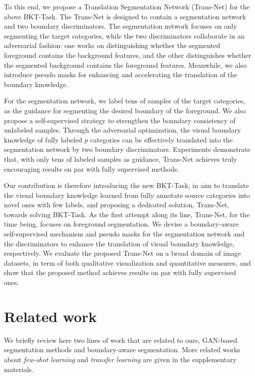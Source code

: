 \documentclass[letterpaper]{article} %
\begin{document}
To this end, we propose a Translation Segmentation Network (Trans-Net) for the above BKT-Task. The Trans-Net is designed to contain a segmentation network and two boundary discriminators. The segmentation network focuses on only segmenting the target categories, while the two discriminators collaborate in an
adversarial fashion: one works {on distinguishing whether the segmented foreground contains the background features,}
and the other {distinguishes whether the segmented background  contains the foreground features}.
Meanwhile, we also introduce pseudo masks {for enhancing and accelerating the translation of the boundary knowledge.}

For the segmentation network, we label tens of samples of
the target categories, as the guidance for segmenting the desired boundary of the foreground. We also propose
a self-supervised strategy  to
strengthen the boundary consistency of unlabeled samples.
Through the adversarial optimization, the visual boundary knowledge of fully labeled $p$ categories
can be effectively translated into the segmentation network by two boundary discriminators. Experiments demonstrate that, with only tens of labeled samples as guidance, Trans-Net achieves truly encouraging results on par with fully supervised methods.

Our contribution is therefore introducing
the new BKT-Task, in aim to
translate the visual boundary knowledge learned from
fully annotate source categories
into novel ones with few labels,
and proposing a dedicated solution,
Trans-Net, towards solving BKT-Task.
As the first attempt along its line,
Trans-Net, for the time being,  focuses
on foreground segmentation.
We devise a boundary-aware self-supervised mechanism and pseudo masks
for the segmentation network and the discriminators to enhance the translation of visual boundary knowledge, respectively.
We evaluate the proposed Trans-Net on a broad domain of image datasets, in term of both qualitative visualization and quantitative measures,
and show that the proposed method achieves results on par with
fully supervised ones.

\section{Related work}
We briefly review here two lines of work that are related to ours, GAN-based segmentation methods and boundary-aware segmentation.
More related works about \emph{few-shot learning} and \emph{transfer learning} are given in the supplementary materials.
\end{document}
